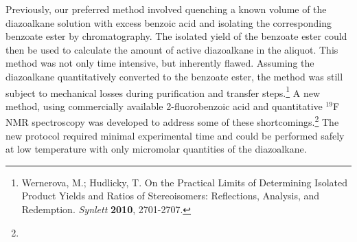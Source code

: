 Previously, our preferred method involved quenching a known volume of the
diazoalkane solution with excess benzoic acid and isolating the corresponding
benzoate ester by chromatography. The isolated yield of the
benzoate ester could then be used to calculate the amount of active diazoalkane
in the aliquot. This method was not only time intensive, but inherently flawed.
Assuming the diazoalkane quantitatively converted to the benzoate ester, the
method was still subject to mechanical losses during purification and transfer
steps.\footnote{{\frenchspacing Wernerova, M.; Hudlicky, T. On the Practical Limits of Determining
Isolated Product Yields and Ratios of Stereoisomers: Reflections, Analysis, and Redemption.
\textit{Synlett} \textbf{2010}, 2701-2707.}} A new method, using commercially available 2-fluorobenzoic acid and quantitative $^{19}$F NMR spectroscopy was developed to address some of these shortcomings.\footnote{} The new protocol required minimal experimental time and could be performed safely at
low temperature with only micromolar quantities of the diazoalkane.

